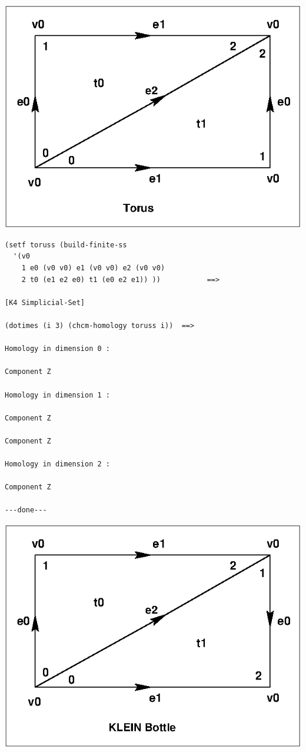 \centerline{\includegraphics{toruss.eps}}
\vskip 0.40cm
%
{\footnotesize\begin{verbatim}
(setf toruss (build-finite-ss 
  '(v0
    1 e0 (v0 v0) e1 (v0 v0) e2 (v0 v0)
    2 t0 (e1 e2 e0) t1 (e0 e2 e1)) ))           ==>

[K4 Simplicial-Set]

(dotimes (i 3) (chcm-homology toruss i))  ==>

Homology in dimension 0 :

Component Z

Homology in dimension 1 :

Component Z

Component Z

Homology in dimension 2 :

Component Z

---done---
\end{verbatim}}
\newpage
%
\vskip 0.40cm
\centerline{\includegraphics{bottless.eps}}
